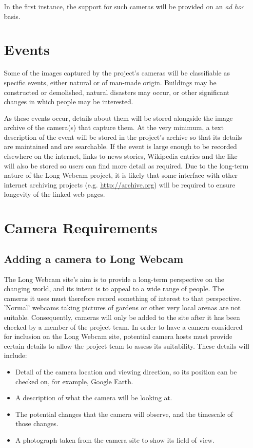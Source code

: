 \documentclass[11pt,a4paper]{article}
\begin{document}
In the first instance, the support for such cameras will be provided on an \textit{ad hoc} basis.


\section{Events}
Some of the images captured by the project's cameras will be classifiable as specific events, either natural or of man-made origin. Buildings may be constructed or demolished, natural disasters may occur, or other significant changes in which people may be interested.

As these events occur, details about them will be stored alongside the image archive of the camera(s) that capture them. At the very minimum, a text description of the event will be stored in the project's archive so that its details are maintained and are searchable. If the event is large enough to be recorded elsewhere on the internet, links to news stories, Wikipedia entries and the like will also be stored so users can find more detail as required. Due to the long-term nature of the Long Webcam project, it is likely that some interface with other internet archiving projects (e.g. \url{http://archive.org}) will be required to ensure longevity of the linked web pages.

\section{Camera Requirements}
\subsection{Adding a camera to Long Webcam}
The Long Webcam site's aim is to provide a long-term perspective on the changing world, and its intent is to appeal to a wide range of people. The cameras it uses must therefore record something of interest to that perspective. 'Normal' webcams taking pictures of gardens or other very local arenas are not suitable. Consequently, cameras will only be added to the site after it has been checked by a member of the project team. In order to have a camera considered for inclusion on the Long Webcam site, potential camera hosts must provide certain details to allow the project team to assess its suitability. These details will include:

\begin{itemize}
\item Detail of the camera location and viewing direction, so its position can be checked on, for example, Google Earth.
\item A description of what the camera will be looking at.
\item The potential changes that the camera will observe, and the timescale of those changes.
\item A photograph taken from the camera site to show its field of view.
\end{itemize}
\end{document}
